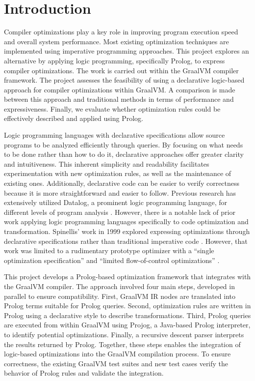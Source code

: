 \chapter[Introduction]{Introduction}

Compiler optimizations play a key role in improving program execution speed and overall system performance. Most existing optimization techniques are implemented using imperative programming approaches. This project explores an alternative by applying logic programming, specifically Prolog, to express compiler optimizations. The work is carried out within the GraalVM compiler framework. The project assesses the feasibility of using a declarative logic-based approach for compiler optimizations within GraalVM. A comparison is made between this approach and traditional methods in terms of performance and expressiveness. Finally, we evaluate whether optimization rules could be effectively described and applied using Prolog.

Logic programming languages with declarative specifications allow source programs to be analyzed efficiently through queries. By focusing on what needs to be done rather than how to do it, declarative approaches offer greater clarity and intuitiveness. This inherent simplicity and readability facilitates experimentation with new optimization rules, as well as the maintenance of existing ones. Additionally, declarative code can be easier to verify correctness because it is more straightforward and easier to follow. Previous research has extensively utilized Datalog, a prominent logic programming language, for different levels of program analysis \cite{Bravenboer2009,Tonder2021,Lam2005,Benton2007}. However, there is a notable lack of prior work applying logic programming languages specifically to code optimization and transformation. Spinellis’ work in 1999 explored expressing optimizations through declarative specifications rather than traditional imperative code \cite{Spinellis1999}. However, that work was limited to a rudimentary prototype optimizer with a ``single optimization specification'' and ``limited flow-of-control optimizations'' \cite{Spinellis1999}.

This project develops a Prolog-based optimization framework that integrates with the GraalVM compiler. The approach involved four main steps, developed in parallel to ensure compatibility. 
First, GraalVM IR nodes are translated into Prolog terms suitable for Prolog queries.
Second, optimization rules are written in Prolog using a declarative style to describe transformations. 
Third, Prolog queries are executed from within GraalVM using Projog, a Java-based Prolog interpreter, to identify potential optimizations. Finally, a recursive descent parser interprets the results returned by Prolog.
Together, these steps enables the integration of logic-based optimizations into the GraalVM compilation process. 
To ensure correctness, the existing GraalVM test suites and new test cases verify the behavior of Prolog rules and validate the integration.

